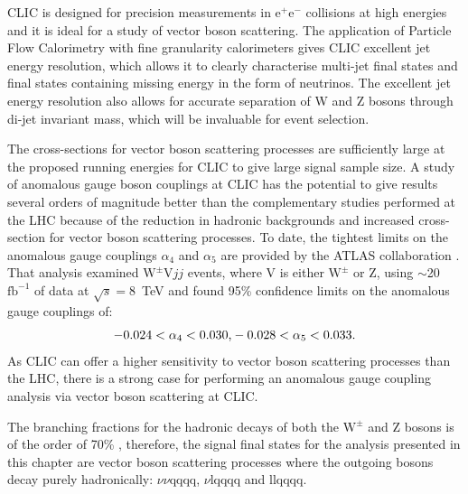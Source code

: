 CLIC is designed for precision measurements in $\text{e}^{+}\text{e}^{-}$ collisions at high energies and it is ideal for a study of vector boson scattering.  The application of Particle Flow Calorimetry with fine granularity calorimeters gives CLIC excellent jet energy resolution, which allows it to clearly characterise multi-jet final states and final states containing missing energy in the form of neutrinos.  The excellent jet energy resolution also allows for accurate separation of W and Z bosons through di-jet invariant mass, which will be invaluable for event selection.  

The cross-sections for vector boson scattering processes are sufficiently large at the proposed running energies for CLIC to give large signal sample size.  A study of anomalous gauge boson couplings at CLIC has the potential to give results several orders of magnitude better than the complementary studies performed at the LHC because of the reduction in hadronic backgrounds and increased cross-section for vector boson scattering processes.  {To date, the tightest limits on the anomalous gauge couplings $\alpha_{4}$ and $\alpha_{5}$ are provided by the ATLAS collaboration \cite{Green:2016trm}.  That analysis examined $\text{W}^{\pm}\text{V}jj$ events, where V is either $\text{W}^{\pm}$ or Z, using $\sim$20 $\text{fb}^{-1}$ of data at $\sqrt{s} = 8$~TeV and found 95\% confidence limits on the anomalous gauge couplings of:}
%
\begin{equation}
-0.024 < \alpha_{4} < 0.030 \text{,} \\
-0.028 < \alpha_{5} < 0.033 \text{.}
\end{equation}
%
{As CLIC can offer a higher sensitivity to vector boson scattering processes than the LHC, there is} a strong case for performing {an anomalous gauge coupling analysis via vector boson scattering} at CLIC.  

The branching fractions for the hadronic decays of both the $\text{W}^{\pm}$ and Z bosons is of the order of 70\% \cite{Beringer:1900zz}, therefore, the signal final states for the analysis presented in this chapter are vector boson scattering processes where the outgoing bosons decay purely hadronically: $\nu\nu\text{qqqq}$, $\nu\text{lqqqq}$ and llqqqq.  


